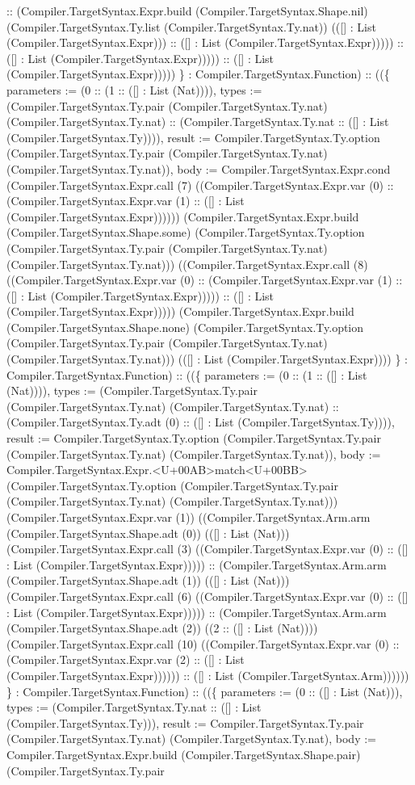 \documentclass[11pt]{article}
\begin{document}
:: (Compiler.TargetSyntax.Expr.build (Compiler.TargetSyntax.Shape.nil) (Compiler.TargetSyntax.Ty.list (Compiler.TargetSyntax.Ty.nat)) (([] : List (Compiler.TargetSyntax.Expr))) :: ([] : List (Compiler.TargetSyntax.Expr))))) :: ([] : List (Compiler.TargetSyntax.Expr))))) :: ([] : List (Compiler.TargetSyntax.Expr))))) \} : Compiler.TargetSyntax.Function) :: ((\{ parameters := (0 :: (1 :: ([] : List (Nat)))), types := (Compiler.TargetSyntax.Ty.pair (Compiler.TargetSyntax.Ty.nat) (Compiler.TargetSyntax.Ty.nat) :: (Compiler.TargetSyntax.Ty.nat :: ([] : List (Compiler.TargetSyntax.Ty)))), result := Compiler.TargetSyntax.Ty.option (Compiler.TargetSyntax.Ty.pair (Compiler.TargetSyntax.Ty.nat) (Compiler.TargetSyntax.Ty.nat)), body := Compiler.TargetSyntax.Expr.cond (Compiler.TargetSyntax.Expr.call (7) ((Compiler.TargetSyntax.Expr.var (0) :: (Compiler.TargetSyntax.Expr.var (1) :: ([] : List (Compiler.TargetSyntax.Expr)))))) (Compiler.TargetSyntax.Expr.build (Compiler.TargetSyntax.Shape.some) (Compiler.TargetSyntax.Ty.option (Compiler.TargetSyntax.Ty.pair (Compiler.TargetSyntax.Ty.nat) (Compiler.TargetSyntax.Ty.nat))) ((Compiler.TargetSyntax.Expr.call (8) ((Compiler.TargetSyntax.Expr.var (0) :: (Compiler.TargetSyntax.Expr.var (1) :: ([] : List (Compiler.TargetSyntax.Expr))))) :: ([] : List (Compiler.TargetSyntax.Expr))))) (Compiler.TargetSyntax.Expr.build (Compiler.TargetSyntax.Shape.none) (Compiler.TargetSyntax.Ty.option (Compiler.TargetSyntax.Ty.pair (Compiler.TargetSyntax.Ty.nat) (Compiler.TargetSyntax.Ty.nat))) (([] : List (Compiler.TargetSyntax.Expr)))) \} : Compiler.TargetSyntax.Function) :: ((\{ parameters := (0 :: (1 :: ([] : List (Nat)))), types := (Compiler.TargetSyntax.Ty.pair (Compiler.TargetSyntax.Ty.nat) (Compiler.TargetSyntax.Ty.nat) :: (Compiler.TargetSyntax.Ty.adt (0) :: ([] : List (Compiler.TargetSyntax.Ty)))), result := Compiler.TargetSyntax.Ty.option (Compiler.TargetSyntax.Ty.pair (Compiler.TargetSyntax.Ty.nat) (Compiler.TargetSyntax.Ty.nat)), body := Compiler.TargetSyntax.Expr.<U+00AB>match<U+00BB> (Compiler.TargetSyntax.Ty.option (Compiler.TargetSyntax.Ty.pair (Compiler.TargetSyntax.Ty.nat) (Compiler.TargetSyntax.Ty.nat))) (Compiler.TargetSyntax.Expr.var (1)) ((Compiler.TargetSyntax.Arm.arm (Compiler.TargetSyntax.Shape.adt (0)) (([] : List (Nat))) (Compiler.TargetSyntax.Expr.call (3) ((Compiler.TargetSyntax.Expr.var (0) :: ([] : List (Compiler.TargetSyntax.Expr))))) :: (Compiler.TargetSyntax.Arm.arm (Compiler.TargetSyntax.Shape.adt (1)) (([] : List (Nat))) (Compiler.TargetSyntax.Expr.call (6) ((Compiler.TargetSyntax.Expr.var (0) :: ([] : List (Compiler.TargetSyntax.Expr))))) :: (Compiler.TargetSyntax.Arm.arm (Compiler.TargetSyntax.Shape.adt (2)) ((2 :: ([] : List (Nat)))) (Compiler.TargetSyntax.Expr.call (10) ((Compiler.TargetSyntax.Expr.var (0) :: (Compiler.TargetSyntax.Expr.var (2) :: ([] : List (Compiler.TargetSyntax.Expr)))))) :: ([] : List (Compiler.TargetSyntax.Arm)))))) \} : Compiler.TargetSyntax.Function) :: ((\{ parameters := (0 :: ([] : List (Nat))), types := (Compiler.TargetSyntax.Ty.nat :: ([] : List (Compiler.TargetSyntax.Ty))), result := Compiler.TargetSyntax.Ty.pair (Compiler.TargetSyntax.Ty.nat) (Compiler.TargetSyntax.Ty.nat), body := Compiler.TargetSyntax.Expr.build (Compiler.TargetSyntax.Shape.pair) (Compiler.TargetSyntax.Ty.pair 
\end{document}
